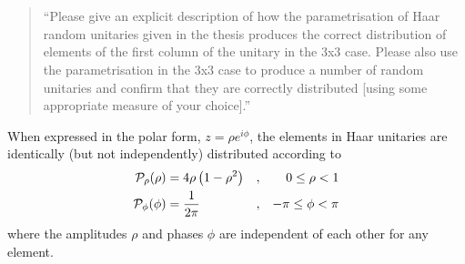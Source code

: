 \documentclass[a4paper,11pt]{article}
\begin{document}
\section{}
\begin{quote}
  ``Please give an explicit description of how the parametrisation of
  Haar random unitaries given in the thesis produces the correct
  distribution of elements of the first column of the unitary in the 3x3
  case.  Please also use the parametrisation in the 3x3 case to produce
  a number of random unitaries and confirm that they are correctly
  distributed [using some appropriate measure of your choice].''
\end{quote}
When expressed in the polar form, \(z=\rho e^{i\phi}\), the elements in Haar
unitaries are identically (but not independently) distributed according to
\cite{haar-entries, reffy}
\begin{align}
  \label{eq:rho}
  \mathcal{P}_{\rho} \!\left(\rho\right) &= 4\rho\left(1-\rho^{2}\right) &,
    && 0 \leq \rho < 1 \\
  \label{eq:phi}
  \mathcal{P}_{\phi} \!\left(\phi\right) &= \frac{1}{2\pi} &, && -\pi \leq \phi < \pi
\end{align}
where the amplitudes \(\rho\) and phases \(\phi\) are independent of each other
for any element.
\end{document}
